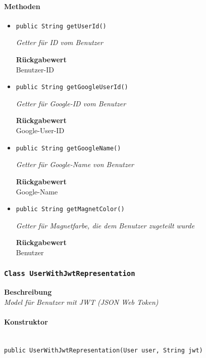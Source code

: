     \paragraph*{Methoden}
    \begin{itemize}
    	\item{\texttt{public String getUserId()}}
    	
    	\textit{Getter für ID vom Benutzer}
    	
    	
    	
    	\textbf{Rückgabewert} \\
    	Benutzer-ID        \item{\texttt{public String getGoogleUserId()}}
    	
    	\textit{Getter für Google-ID vom Benutzer}
    	
    	
    	
    	\textbf{Rückgabewert} \\
    	Google-User-ID        \item{\texttt{public String getGoogleName()}}
    	
    	\textit{Getter für Google-Name von Benutzer}
    	
    	
    	
    	\textbf{Rückgabewert} \\
    	Google-Name        \item{\texttt{public String getMagnetColor()}}
    	
    	\textit{Getter für Magnetfarbe, die dem Benutzer zugeteilt wurde}
    	
    	
    	
    	\textbf{Rückgabewert} \\
    	Benutzer
    \end{itemize}
    \subsubsection{\texttt{Class UserWithJwtRepresentation}}
    \textbf{Beschreibung} \\
    \textit{Model für Benutzer mit JWT (JSON Web Token)}
    \paragraph*{Konstruktor}\mbox{} \\
    \texttt{public UserWithJwtRepresentation(User user, String jwt)} \\

